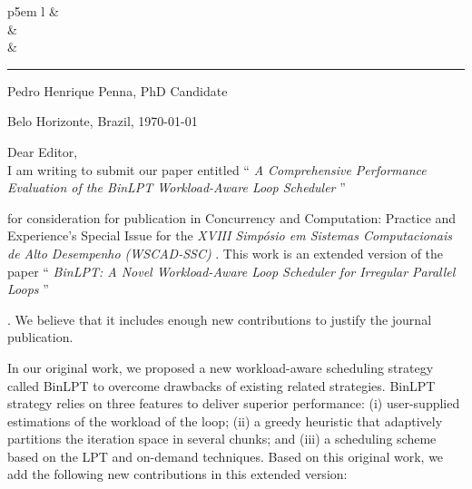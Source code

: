 \documentclass[a4paper,10pt,english]{article}
\def\firstname{Pedro Henrique\xspace}
\def\lastname{Penna\xspace}
\def\status{PhD Candidate\xspace}
\def\university{\pucminas}
\def\institute{\dcc}
\def\department{\ppginf}
\def\laboratory{\cart}
\def\city{Belo Horizonte, Brazil\xspace}
\def\prevarticle{%
	``\textit{%
		BinLPT: A Novel Workload-Aware Loop
		Scheduler for Irregular Parallel Loops%
	}''
\xspace
}
\def\newarticle{%
	``\textit{%
		A Comprehensive Performance Evaluation of
		the BinLPT Workload-Aware Loop Scheduler%
	}''
\xspace
}
\def\conference{%
	\textit{
		XVIII Simpósio em Sistemas Computacionais de Alto Desempenho (WSCAD-SSC)
	}
}
\begin{document}
\begin{tabular}{ p{5em} l }
		& {\large\bf{\university}} \\[0.2em]
		& \institute               \\
		& \department              \\[0.4em]
\end{tabular}

\rule{\linewidth}{0.5pt}



\begin{flushleft}
\firstname \lastname, \status\\
\laboratory
\end{flushleft}

\begin{flushright}
\city, \today
\end{flushright}

Dear Editor, \\

I am writing to submit our paper entitled \newarticle for consideration for
publication in Concurrency and Computation: Practice and Experience's Special
Issue for the \conference.  This work is an extended version of the paper
\prevarticle. We believe that it includes enough new contributions to justify
the journal publication.

In our original work, we proposed a new workload-aware scheduling strategy
called BinLPT to overcome drawbacks of existing related strategies. BinLPT
strategy relies on three features to deliver superior performance:  (i)
user-supplied estimations of the workload of the loop; (ii) a greedy heuristic
that adaptively partitions the iteration space in several chunks; and (iii) a
scheduling scheme based on the LPT and on-demand techniques.  Based on this
original work, we add the following new contributions in this extended version:
\end{document}
